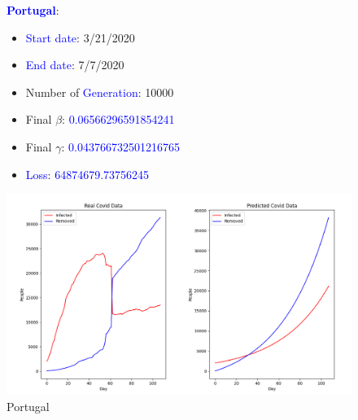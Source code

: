 \documentclass[a4paper]{article}
\begin{document}
    \begin{figure}[ht]
    \centering
    \textbf{\textcolor{blue}{Portugal}}: 
    \begin{itemize}
        \item \textcolor{blue}{Start date}: 3/21/2020
        \item \textcolor{blue}{End date}: 7/7/2020
        \item Number of \textcolor{blue}{Generation}: 10000
        \item Final $\beta$: \textcolor{blue}{0.06566296591854241}
        \item Final $\gamma$: \textcolor{blue}{0.043766732501216765}
        \item \textcolor{blue}{Loss}: \textcolor{blue}{64874679.73756245}
    \end{itemize}
    \includegraphics[width= \linewidth]{ex5-plot/Portugal.png}
    \caption{Portugal}
     \end{figure}
     
\end{document}
